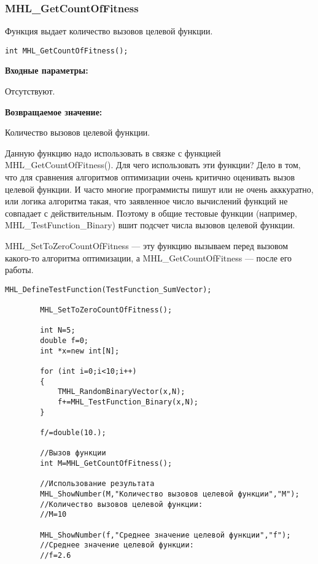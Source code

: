 \documentclass[a4paper,12pt]{article}
\begin{document}
\subsubsection{MHL\_GetCountOfFitness}\label{MHL_GetCountOfFitness}

Функция выдает количество вызовов целевой функции.


\begin{lstlisting}[label=code_syntax_MHL_GetCountOfFitness,caption=Синтаксис]
int MHL_GetCountOfFitness();
\end{lstlisting}

\textbf{Входные параметры:}

Отсутствуют.

\textbf{Возвращаемое значение:}
 
Количество вызовов целевой функции.

Данную функцию надо использовать в связке с функцией MHL\_GetCountOfFitness(). Для чего использовать эти функции? Дело в том, что для сравнения алгоритмов оптимизации очень критично оценивать вызов целевой функции. И часто многие программисты пишут или не очень акккуратно, или логика алгоритма такая, что заявленное число вычислений функций не совпадает с действительным. Поэтому в общие тестовые функции (например, MHL\_TestFunction\_Binary) вшит подсчет числа вызовов целевой функции.

MHL\_SetToZeroCountOfFitness --- эту функцию вызываем перед вызовом какого-то алгоритма оптимизации, а MHL\_GetCountOfFitness --- после его работы.


\begin{lstlisting}[label=code_use_MHL_GetCountOfFitness,caption=Пример использования]
        MHL_DefineTestFunction(TestFunction_SumVector);

        MHL_SetToZeroCountOfFitness();

        int N=5;
        double f=0;
        int *x=new int[N];

        for (int i=0;i<10;i++)
        {
            TMHL_RandomBinaryVector(x,N);
            f+=MHL_TestFunction_Binary(x,N);
        }

        f/=double(10.);

        //Вызов функции
        int M=MHL_GetCountOfFitness();

        //Использование результата
        MHL_ShowNumber(M,"Количество вызовов целевой функции","M");
        //Количество вызовов целевой функции:
        //M=10

        MHL_ShowNumber(f,"Среднее значение целевой функции","f");
        //Среднее значение целевой функции:
        //f=2.6
\end{lstlisting}
\end{document}
